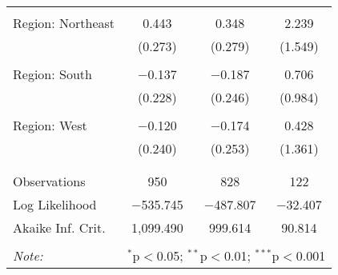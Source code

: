 \begin{tabular}{@{\extracolsep{5pt}}lccc}
  & & & \\ 
 Region: Northeast & 0.443 & 0.348 & 2.239 \\ 
  & (0.273) & (0.279) & (1.549) \\ 
  & & & \\ 
 Region: South & $-$0.137 & $-$0.187 & 0.706 \\ 
  & (0.228) & (0.246) & (0.984) \\ 
  & & & \\ 
 Region: West & $-$0.120 & $-$0.174 & 0.428 \\ 
  & (0.240) & (0.253) & (1.361) \\ 
  & & & \\ 
\hline \\[-1.8ex] 
Observations & 950 & 828 & 122 \\ 
Log Likelihood & $-$535.745 & $-$487.807 & $-$32.407 \\ 
Akaike Inf. Crit. & 1,099.490 & 999.614 & 90.814 \\ 
\hline 
\hline \\[-1.8ex] 
\textit{Note:}  & \multicolumn{3}{r}{$^{*}$p$<$0.05; $^{**}$p$<$0.01; $^{***}$p$<$0.001} \\ 
\end{tabular} 
